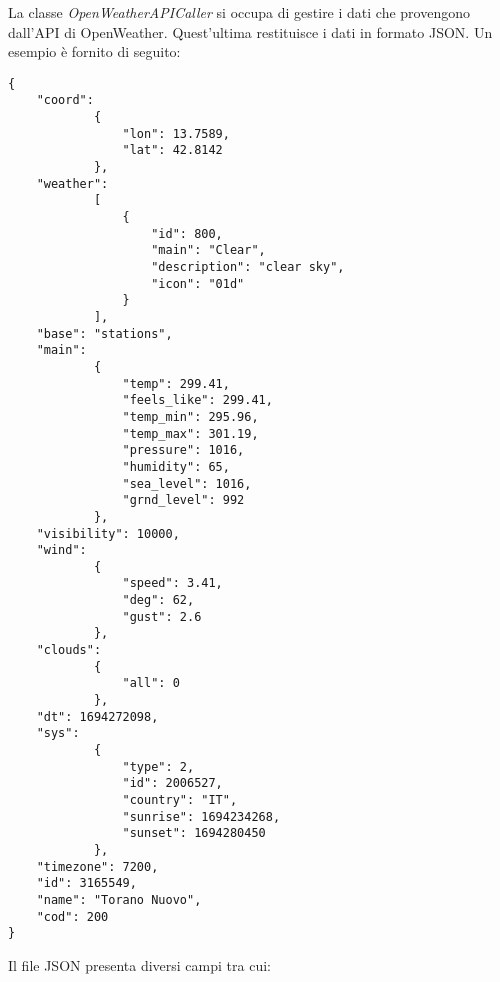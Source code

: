 La classe \textit{OpenWeatherAPICaller} si occupa di gestire i dati che provengono dall'API di OpenWeather. Quest'ultima restituisce i dati in formato JSON. Un esempio è fornito di seguito:

\begin{lstlisting}
{
    "coord":
            {
                "lon": 13.7589,
                "lat": 42.8142
            },
    "weather":
            [
                {
                    "id": 800,
                    "main": "Clear",
                    "description": "clear sky",
                    "icon": "01d"
                }
            ],
    "base": "stations",
    "main":
            {
                "temp": 299.41,
                "feels_like": 299.41,
                "temp_min": 295.96,
                "temp_max": 301.19,
                "pressure": 1016,
                "humidity": 65,
                "sea_level": 1016,
                "grnd_level": 992
            },
    "visibility": 10000,
    "wind":
            {
                "speed": 3.41,
                "deg": 62,
                "gust": 2.6
            },
    "clouds":
            {
                "all": 0
            },
    "dt": 1694272098,
    "sys":
            {
                "type": 2,
                "id": 2006527,
                "country": "IT",
                "sunrise": 1694234268,
                "sunset": 1694280450
            },
    "timezone": 7200,
    "id": 3165549,
    "name": "Torano Nuovo",
    "cod": 200
} 
\end{lstlisting}

Il file JSON presenta diversi campi tra cui:

